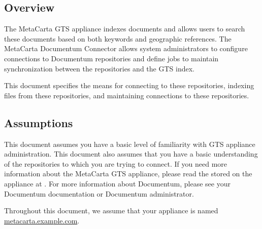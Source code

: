 %
%

\begin{changemargin}{1.5in}{0in}

\section{Overview}

The MetaCarta GTS appliance indexes documents and allows users to search
these documents based on both keywords and geographic references. The
MetaCarta Documentum Connector allows system administrators to configure
connections to Documentum repositories and define jobs to maintain
synchronization between the repositories and the GTS index.

This document specifies the means for connecting to these repositories,
indexing files from these repositories, and maintaining connections to
these repositories.

\subsection{Assumptions}

This document assumes you have a basic level of familiarity with GTS
appliance administration. This document also assumes that you have
a basic understanding of the repositories to which you are trying to
connect. If you need more information about the MetaCarta GTS appliance,
please read the  stored
on the appliance at . For
more information about Documentum, please see your Documentum documentation
or Documentum administrator.

Throughout this document, we assume that your appliance is named \\
\url{metacarta.example.com}. 



\end{changemargin}
